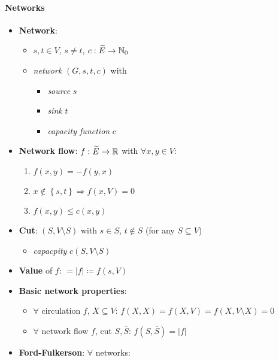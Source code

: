 \paragraph{Networks}
\begin{itemize}
  \item \textbf{Network}:
  \begin{itemize}
    \item \( s,t \in V \), \( s \neq t \), \( c: \widetilde{E} \to \mathbb{N}_0 \)
    \item \emph{network} \( \left( G,s,t,c \right) \) with
    \begin{itemize}
      \item \emph{source} \( s \)
      \item \emph{sink} \( t \)
      \item \emph{capacity function} \( c \)
    \end{itemize}
  \end{itemize}
  \item \textbf{Network flow}: \( f: \widetilde{E} \to \mathbb{R} \) with \( \forall x,y \in V \):
  \begin{enumerate}
    \item \( f(x,y) = -f(y,x) \)
    \item \( x \not \in \left \{ s,t \right \} \Rightarrow f(x,V) = 0 \)
    \item \( f(x,y) \leq c(x,y) \)
  \end{enumerate}
  \item \textbf{Cut}: \( (S, V \setminus S) \) with \( s \in S \), \( t \not \in S \) (for any \( S \subseteq V \))
  \begin{itemize}
    \item \emph{capacpity} \( c(S,V \setminus S) \)
  \end{itemize}
  \item \textbf{Value} of \( f \): \( = \left\vert f \right\vert \coloneqq f(s,V) \)
  \item \textbf{Basic network properties}:
  \begin{itemize}
    \item \( \forall \) circulation \( f \), \( X \subseteq V \): \( f(X,X) = f(X,V) = f(X, V \setminus X) = 0 \)
    \item \( \forall \) network flow \( f \), cut \( S,\overline{S} \): \( f(S,\overline{S}) = \left\vert f \right\vert \)
  \end{itemize}
  \item \textbf{Ford-Fulkerson}: \( \forall \) networks:
  \begin{itemize}

\end{itemize}
\end{itemize}
